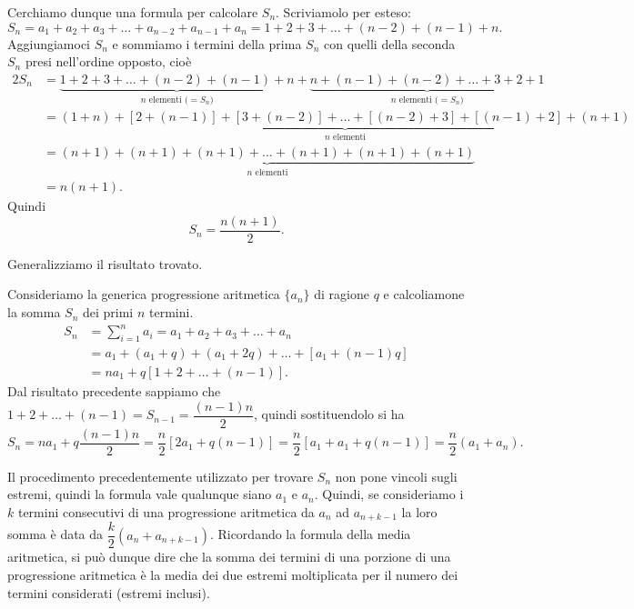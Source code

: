 Cerchiamo dunque una formula per calcolare $S_n$. Scriviamolo per esteso:
\[S_n = a_1 + a_2 + a_3 + \ldots + a_{n-2} + a_{n-1} + a_n = 1 + 2 + 3 + \ldots + (n-2) + (n-1) + n.\]
Aggiungiamoci $S_n$ e sommiamo i termini della prima $S_n$ con quelli della seconda $S_n$ presi nell'ordine opposto, cioè
\begin{align*}
2S_n &= \underbrace{1 + 2 + 3 + \ldots + (n-2) + (n-1) + n}_{n\text{ elementi (}=S_n\text{)}} + \underbrace{n + (n-1) + (n-2) + \ldots + 3 + 2 + 1}_{n\text{ elementi (}=S_n\text{)}}\\
&=\underbrace{(1 + n) + [2 + (n-1)] + [3 + (n-2)] + \ldots + [(n-2) + 3] + [(n-1) + 2] + (n + 1)}_{n\text{ elementi}}\\
&=\underbrace{(n + 1) + (n + 1) + (n + 1) + \ldots + (n + 1) + (n + 1) + (n + 1)}_{n\text{ elementi}}\\
&=n(n+1).
\end{align*}
Quindi
\[S_n = \frac{n(n+1)}{2}.\]

Generalizziamo il risultato trovato.

Consideriamo la generica progressione aritmetica $\{a_n\}$ di ragione $q$ e calcoliamone la somma $S_n$ dei primi $n$ termini.
\begin{align*}
S_n &= \sum_{i=1}^{n}a_i=a_1+a_2+a_3+\ldots+a_n\\
&=a_1+(a_1+q)+(a_1+2q)+\ldots+[a_1+(n-1)q]\\
&=na_1+q[1+2+\ldots+(n-1)].
\end{align*}
Dal risultato precedente sappiamo che $1+2+\ldots+(n-1)=S_{n-1}=\dfrac{(n-1)n}{2}$, quindi sostituendolo si ha
\[S_n=na_1+q\frac{(n-1)n}{2}=\frac{n}{2}[2a_1+q(n-1)]=\frac{n}{2}[a_1+a_1+q(n-1)]=\frac{n}{2}(a_1+a_n).\]

Il procedimento precedentemente utilizzato per trovare $S_n$ non pone vincoli sugli estremi, quindi la formula vale qualunque siano $a_1$ e $a_n$. Quindi, se consideriamo i $k$ termini consecutivi di una progressione aritmetica da $a_n$ ad $a_{n+k-1}$ la loro somma è data da $\dfrac{k}{2}(a_n+a_{n+k-1})$. Ricordando la formula della media aritmetica, si può dunque dire che la somma dei termini di una porzione di una progressione aritmetica è la media dei due estremi moltiplicata per il numero dei termini considerati (estremi inclusi).

\vspazio\ovalbox{\risolvii \ref{ese:8a_progr.1}, \ref{ese:8a_progr.2}, \ref{ese:8a_progr.3}, \ref{ese:8a_progr.4}, \ref{ese:8a_progr.5}, \ref{ese:8a_progr.6}, \ref{ese:8a_progr.7}, \ref{ese:8a_progr.8}, \ref{ese:8a_progr.8}, \ref{ese:8a_progr.9}, \ref{ese:8a_progr.10},}

